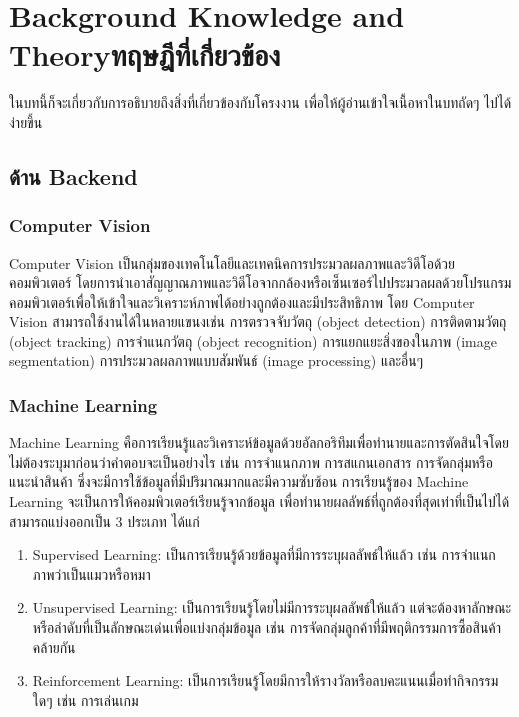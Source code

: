 \chapter{\ifenglish Background Knowledge and Theory\else ทฤษฎีที่เกี่ยวข้อง\fi}

ในบทนี้ก็จะเกี่ยวกับการอธิบายถึงสิ่งที่เกี่ยวข้องกับโครงงาน เพื่อให้ผู้อ่านเข้าใจเนื้อหาในบทถัดๆ ไปได้ง่ายขึ้น

\section{ด้าน Backend}

\subsection{Computer Vision}
Computer Vision เป็นกลุ่มของเทคโนโลยีและเทคนิคการประมวลผลภาพและวิดีโอด้วยคอมพิวเตอร์ โดยการนำเอาสัญญาณภาพและวิดีโอจากกล้องหรือเซ็นเซอร์ไปประมวลผลด้วยโปรแกรมคอมพิวเตอร์เพื่อให้เข้าใจและวิเคราะห์ภาพได้อย่างถูกต้องและมีประสิทธิภาพ
\enskip
โดย Computer Vision สามารถใช้งานได้ในหลายแขนงเช่น การตรวจจับวัตถุ (object detection) การติดตามวัตถุ (object tracking) การจำแนกวัตถุ (object recognition) การแยกแยะสิ่งของในภาพ (image segmentation) การประมวลผลภาพแบบสัมพันธ์ (image processing) และอื่นๆ\cite{Vision}

\subsection{Machine Learning}
Machine Learning คือการเรียนรู้และวิเคราะห์ข้อมูลด้วยอัลกอริทึมเพื่อทำนายและการตัดสินใจโดยไม่ต้องระบุมาก่อนว่าคำตอบจะเป็นอย่างไร
เช่น การจำแนกภาพ การสแกนเอกสาร การจัดกลุ่มหรือแนะนำสินค้า ซึ่งจะมีการใช้ข้อมูลที่มีปริมาณมากและมีความซับซ้อน 
การเรียนรู้ของ Machine Learning จะเป็นการให้คอมพิวเตอร์เรียนรู้จากข้อมูล เพื่อทำนายผลลัพธ์ที่ถูกต้องที่สุดเท่าที่เป็นไปได้ สามารถแบ่งออกเป็น 3 ประเภท ได้แก่
\begin{enumerate}
  \item Supervised Learning: เป็นการเรียนรู้ด้วยข้อมูลที่มีการระบุผลลัพธ์ให้แล้ว เช่น การจำแนกภาพว่าเป็นแมวหรือหมา
  \item Unsupervised Learning: เป็นการเรียนรู้โดยไม่มีการระบุผลลัพธ์ให้แล้ว แต่จะต้องหาลักษณะหรือลำดับที่เป็นลักษณะเด่นเพื่อแบ่งกลุ่มข้อมูล เช่น การจัดกลุ่มลูกค้าที่มีพฤติกรรมการซื้อสินค้าคล้ายกัน
  \item Reinforcement Learning: เป็นการเรียนรู้โดยมีการให้รางวัลหรือลบคะแนนเมื่อทำกิจกรรมใดๆ เช่น การเล่นเกม
\end{enumerate}
\cite{Machine}
